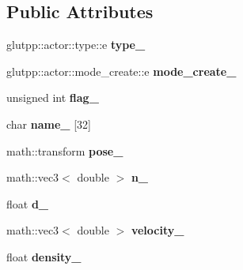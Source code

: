 \subsection*{\-Public \-Attributes}
\begin{DoxyCompactItemize}
\item 
\hypertarget{classglutpp_1_1actor_1_1raw_a08f89fb5941988cc6c3ba52cdd6133aa}{glutpp\-::actor\-::type\-::e {\bfseries type\-\_\-}}\label{classglutpp_1_1actor_1_1raw_a08f89fb5941988cc6c3ba52cdd6133aa}

\item 
\hypertarget{classglutpp_1_1actor_1_1raw_acec042d2aaa59655cdb23df1a82552ef}{glutpp\-::actor\-::mode\-\_\-create\-::e {\bfseries mode\-\_\-create\-\_\-}}\label{classglutpp_1_1actor_1_1raw_acec042d2aaa59655cdb23df1a82552ef}

\item 
\hypertarget{classglutpp_1_1actor_1_1raw_a55d3f6c19e283dbea4b1b936c62b7b93}{unsigned int {\bfseries flag\-\_\-}}\label{classglutpp_1_1actor_1_1raw_a55d3f6c19e283dbea4b1b936c62b7b93}

\item 
\hypertarget{classglutpp_1_1actor_1_1raw_ab8f930c6009c82262297bbbe44438028}{char {\bfseries name\-\_\-} \mbox{[}32\mbox{]}}\label{classglutpp_1_1actor_1_1raw_ab8f930c6009c82262297bbbe44438028}

\item 
\hypertarget{classglutpp_1_1actor_1_1raw_a8ee57595e7a08c63a5081348b5a11f47}{math\-::transform {\bfseries pose\-\_\-}}\label{classglutpp_1_1actor_1_1raw_a8ee57595e7a08c63a5081348b5a11f47}

\item 
\hypertarget{classglutpp_1_1actor_1_1raw_ae68e773c3d16d941ab7e64961935450c}{math\-::vec3$<$ double $>$ {\bfseries n\-\_\-}}\label{classglutpp_1_1actor_1_1raw_ae68e773c3d16d941ab7e64961935450c}

\item 
\hypertarget{classglutpp_1_1actor_1_1raw_a25767c30241b29e73e09e68b35c2a8f2}{float {\bfseries d\-\_\-}}\label{classglutpp_1_1actor_1_1raw_a25767c30241b29e73e09e68b35c2a8f2}

\item 
\hypertarget{classglutpp_1_1actor_1_1raw_a79950ccb0dbcd7774191cd5dc7375a79}{math\-::vec3$<$ double $>$ {\bfseries velocity\-\_\-}}\label{classglutpp_1_1actor_1_1raw_a79950ccb0dbcd7774191cd5dc7375a79}

\item 
\hypertarget{classglutpp_1_1actor_1_1raw_a0285b6aeb5461103769b0f3f4ef0247a}{float {\bfseries density\-\_\-}}\label{classglutpp_1_1actor_1_1raw_a0285b6aeb5461103769b0f3f4ef0247a}


\end{DoxyCompactItemize}
